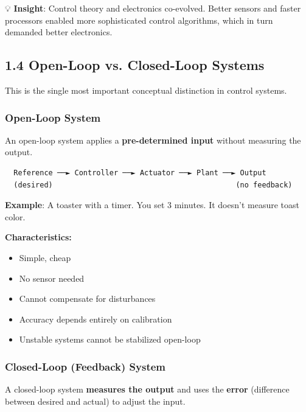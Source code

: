 \documentclass[11pt,a4paper]{book}
\begin{document}
💡 \textbf{Insight}: Control theory and electronics co-evolved. Better sensors and faster processors enabled more sophisticated control algorithms, which in turn demanded better electronics.

\medskip\noindent\hrulefill\medskip

\subsection{1.4 Open-Loop vs. Closed-Loop Systems}

This is the single most important conceptual distinction in control systems.

\subsubsection{Open-Loop System}

An open-loop system applies a \textbf{pre-determined input} without measuring the output.

\begin{lstlisting}
  Reference ──► Controller ──► Actuator ──► Plant ──► Output
  (desired)                                          (no feedback)
\end{lstlisting}

\textbf{Example}: A toaster with a timer. You set 3 minutes. It doesn't measure toast color.

\textbf{Characteristics:}
\begin{itemize}
\item Simple, cheap
\item No sensor needed
\item Cannot compensate for disturbances
\item Accuracy depends entirely on calibration
\item Unstable systems cannot be stabilized open-loop
\end{itemize}

\subsubsection{Closed-Loop (Feedback) System}

A closed-loop system \textbf{measures the output} and uses the \textbf{error} (difference between desired and actual) to adjust the input.

\end{document}
